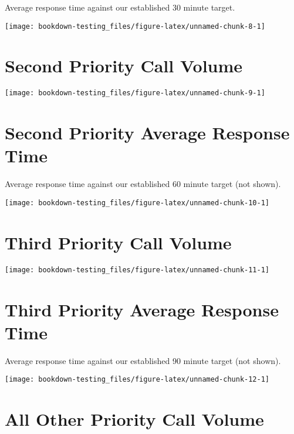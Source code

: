 \documentclass[]{book}
\begin{document}
Average response time against our established 30 minute target.

\texttt{[image: bookdown-testing\_files/figure-latex/unnamed-chunk-8-1]}

\hypertarget{second-priority-call-volume}{%
\section{Second Priority Call Volume}\label{second-priority-call-volume}}

\texttt{[image: bookdown-testing\_files/figure-latex/unnamed-chunk-9-1]}

\hypertarget{second-priority-average-response-time}{%
\section{Second Priority Average Response Time}\label{second-priority-average-response-time}}

Average response time against our established 60 minute target (not shown).

\texttt{[image: bookdown-testing\_files/figure-latex/unnamed-chunk-10-1]}

\hypertarget{third-priority-call-volume}{%
\section{Third Priority Call Volume}\label{third-priority-call-volume}}

\texttt{[image: bookdown-testing\_files/figure-latex/unnamed-chunk-11-1]}

\hypertarget{third-priority-average-response-time}{%
\section{Third Priority Average Response Time}\label{third-priority-average-response-time}}

Average response time against our established 90 minute target (not shown).

\texttt{[image: bookdown-testing\_files/figure-latex/unnamed-chunk-12-1]}

\hypertarget{all-other-priority-call-volume}{%
\section{All Other Priority Call Volume}\label{all-other-priority-call-volume}}
\end{document}
